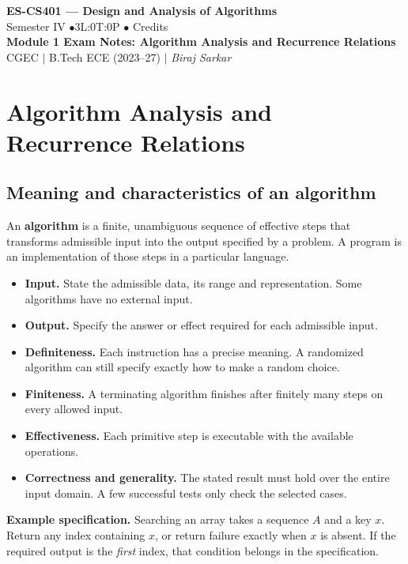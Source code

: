 \documentclass[12pt,a4paper]{article}
\begin{document}
\begin{center}
  {\LARGE\bfseries\color{myred} ES-CS401 --- Design and Analysis of Algorithms}\\[5pt]
  {\normalsize\color{mydark} Semester IV \quad$\bullet$\quad 3L:0T:0P \quad$\bullet$ Credits}\\[3pt]
  {\normalsize\color{myteal}\textbf{Module 1 Exam Notes: Algorithm Analysis and Recurrence Relations}}\\[3pt]
  {\small\color{mydark} CGEC \;$|$\; B.Tech ECE (2023--27) \;$|$\; \textit{Biraj Sarkar}}
\end{center}
\vspace{2pt}
\noindent{\color{myred}\rule{\linewidth}{1.5pt}}
\vspace{2pt}

\hypersetup{linkcolor=mydark}
\tableofcontents
\hypersetup{linkcolor=myteal}
\newpage

\section{Algorithm Analysis and Recurrence Relations}
\subsection{Meaning and characteristics of an algorithm}
\begin{tcolorbox}[defbox, title={Algorithm}]
An \textbf{algorithm} is a finite, unambiguous sequence of effective steps that transforms admissible input into the output specified by a problem. A program is an implementation of those steps in a particular language.
\end{tcolorbox}

\begin{itemize}[leftmargin=*, itemsep=3pt, topsep=4pt]
  \item \textbf{Input.} State the admissible data, its range and representation. Some algorithms have no external input.
  \item \textbf{Output.} Specify the answer or effect required for each admissible input.
  \item \textbf{Definiteness.} Each instruction has a precise meaning. A randomized algorithm can still specify exactly how to make a random choice.
  \item \textbf{Finiteness.} A terminating algorithm finishes after finitely many steps on every allowed input.
  \item \textbf{Effectiveness.} Each primitive step is executable with the available operations.
  \item \textbf{Correctness and generality.} The stated result must hold over the entire input domain. A few successful tests only check the selected cases.
\end{itemize}
\textbf{Example specification.} Searching an array takes a sequence $A$ and a key $x$. Return any index containing $x$, or return failure exactly when $x$ is absent. If the required output is the \emph{first} index, that condition belongs in the specification.
\end{document}
